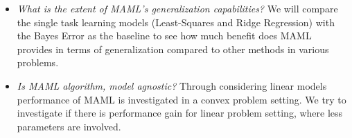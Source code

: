 \begin{itemize}
  \item \textit{What is the extent of MAML's generalization capabilities?} We will compare the single task learning models (\eg Least-Squares and Ridge Regression) with the Bayes Error as the baseline to see how much benefit does MAML provides in terms of generalization compared to other methods in various problems.

  \item \textit{Is MAML algorithm, model agnostic?} Through considering linear models performance of MAML is investigated in a convex problem setting. We try to investigate if there is performance gain for linear problem setting, where less parameters are involved.


\end{itemize}


